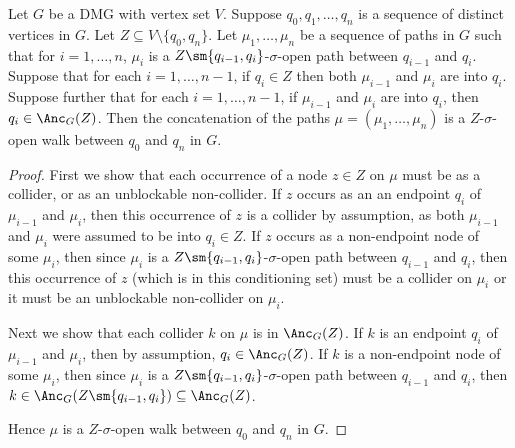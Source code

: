 \begin{Lem}\label{lem:dpag_concatenated_collider_walk}
  Let $G$ be a DMG with vertex set $V$. 
  Suppose $q_0, q_1, \dots, q_n$ is a sequence of distinct vertices in $G$.
  Let $Z \subseteq V \setminus \{q_0,q_n\}$.
  Let $\mu_1,\dots,\mu_n$ be a sequence of paths in $G$ such that for $i=1,\dots,n$,
  $\mu_i$ is a $Z\sm\{q_{i-1},q_i\}$-$\sigma$-open path between $q_{i-1}$ and $q_i$.
  Suppose that for each $i=1,\dots,n-1$, if $q_i \in Z$ then both $\mu_{i-1}$ and $\mu_i$ are into $q_i$.
  Suppose further that for each $i=1,\dots,n-1$, if $\mu_{i-1}$ and $\mu_i$ are into $q_i$, then $q_i \in \Anc_G(Z)$.
  Then the concatenation of the paths $\mu = (\mu_1,\dots,\mu_n)$ is a $Z$-$\sigma$-open walk between $q_0$ and $q_n$ in $G$.
\end{Lem}
\begin{proof}
  First we show that each occurrence of a node $z \in Z$ on $\mu$ must be as a collider, or as an unblockable non-collider.
  If $z$ occurs as an an endpoint $q_i$ of $\mu_{i-1}$ and $\mu_i$, then this occurrence of $z$ is a collider by assumption, as both $\mu_{i-1}$ and $\mu_i$ were assumed to be into $q_i \in Z$.
  If $z$ occurs as a non-endpoint node of some $\mu_i$, then since $\mu_i$ is a $Z\sm\{q_{i-1},q_i\}$-$\sigma$-open path between $q_{i-1}$ and $q_i$, then this occurrence of $z$ (which is in this conditioning set) must be a collider on $\mu_i$ or it must be an unblockable non-collider on $\mu_i$.

  Next we show that each collider $k$ on $\mu$ is in $\Anc_G(Z)$.
  If $k$ is an endpoint $q_i$ of $\mu_{i-1}$ and $\mu_i$, then by assumption, $q_i \in \Anc_G(Z)$.
  If $k$ is a non-endpoint node of some $\mu_i$, then since $\mu_i$ is a $Z\sm\{q_{i-1},q_i\}$-$\sigma$-open path between $q_{i-1}$ and $q_i$, then $k \in \Anc_G(Z\sm\{q_{i-1},q_{i}\}) \subseteq \Anc_G(Z)$.

  Hence $\mu$ is a $Z$-$\sigma$-open walk between $q_0$ and $q_n$ in $G$.
\end{proof}

